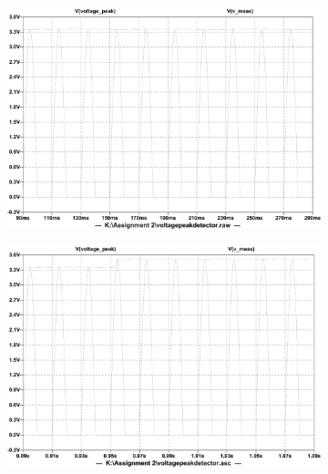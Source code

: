 \begin{figure} [!ht]
 \footnotesize
 \centering
    \begin{subfigure}[]{0.4\textwidth}
              \centering
  		\includegraphics[width=1.0\linewidth]{./Figures/vtrans_simu_nominput.pdf}
		    \caption{} \label{subfig:vtrans_simu_nominput}
     \end{subfigure}
          \begin{subfigure}[]{0.4\textwidth}
             \centering
  		\includegraphics[width=1.0\linewidth]{./Figures/vtrans_simu_nomchange.pdf}
		   \caption{ } \label{subfig:vtrans_simu_nomchange}
     \end{subfigure}
    \begin{subfigure}[]{0.4\textwidth}
              \centering

\end{subfigure}
\end{figure}
